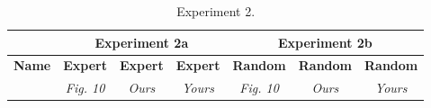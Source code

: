 \begin{table}

\experimentTableSize

\begin{tabular}{l|cccccc}
& \multicolumn{3}{c}{\textbf{Experiment 2a}}
& \multicolumn{3}{c}{\textbf{Experiment 2b}} \\\hline
\textbf{Name} &
\textbf{Expert} & \textbf{Expert} & \textbf{Expert} &
\textbf{Random} & \textbf{Random} & \textbf{Random} \\
&
\textit{Fig. 10} & \textit{Ours} & \textit{Yours} &
\textit{Fig. 10} & \textit{Ours} & \textit{Yours} \\

\end{tabular}

\vspace{0.10in}

\caption{Experiment 2.}

\end{table}
